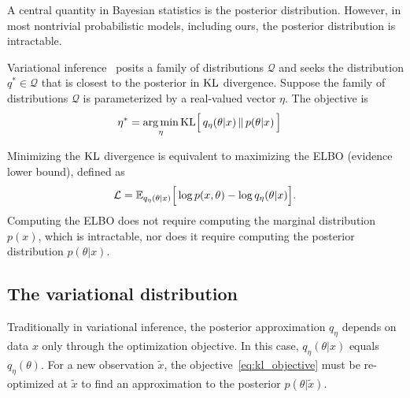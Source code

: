 A central quantity in Bayesian statistics is the posterior distribution. 
However, in most nontrivial probabilistic models, including ours, the posterior distribution is intractable.

Variational inference~\cite{Blei_2017_vi_review, Jordan_intro_vi, Wainwrite_graph_models_vi}
posits a family of distributions $\mathcal{Q}$ and seeks
the distribution $q^*\in \mathcal{Q}$ that is closest to the posterior
in $\textrm{KL}$ divergence. Suppose the family of distributions $\mathcal{Q}$ is parameterized by a real-valued vector $\eta$. The objective is 
\begin{align}
   \eta^* &= \operatorname*{arg\,min}_{\eta} \mathrm{KL}\Big[\,q_\eta(\theta | x)\, \| \,p(\theta | x )\,\Big] 
   \label{eq:kl_objective}
\end{align}

Minimizing the $\textrm{KL}$ divergence is equivalent to maximizing the ELBO (evidence lower bound), defined as 
\begin{align}
    \mathcal{L} = 
    \mathbb{E}_{q_\eta(\theta | x)}\Big[\log p(x, \theta) - \log q_\eta(\theta | x)\Big].
    \label{eq:elbo}
\end{align}
Computing the ELBO does not require computing the marginal distribution $p(x)$, which is intractable, nor does it
require computing the posterior distribution $p(\theta | x)$.

\subsection{The variational distribution}
\label{sec:var_distr}
Traditionally in variational inference, the posterior approximation 
$q_\eta$ depends on data $x$ only through the optimization objective. In this case, $q_\eta(\theta | x)$ equals $q_\eta(\theta)$. For a new observation $\tilde x$, the objective~\eqref{eq:kl_objective} must be re-optimized at $\tilde x$ to find an 
approximation to the posterior $p(\theta | \tilde x)$. 


